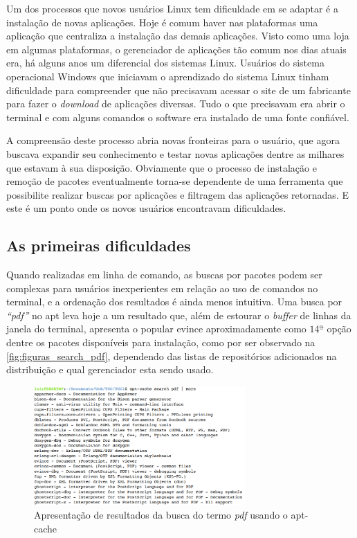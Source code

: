 
Um dos processos  que novos usuários Linux tem dificuldade em se adaptar é a instalação de novas aplicações. Hoje é comum haver nas plataformas uma aplicação que centraliza a instalação das demais aplicações. Visto como uma loja em algumas plataformas, o gerenciador de aplicações tão comum nos dias atuais era, há alguns anos um diferencial dos sistemas Linux. Usuários do sistema operacional Windows que iniciavam o aprendizado do sistema Linux  tinham dificuldade para compreender que não precisavam acessar o site de um fabricante para fazer o \textit{download} de aplicações diversas. Tudo o que precisavam era abrir o terminal e com alguns comandos o software era instalado de uma fonte confiável. 

A compreensão deste processo abria novas fronteiras para o  usuário, que agora buscava expandir seu conhecimento e testar novas aplicações dentre as milhares que estavam à sua disposição. Obviamente que o processo de instalação e remoção de pacotes eventualmente torna-se dependente de uma ferramenta que possibilite realizar buscas por aplicações e filtragem das aplicações retornadas. E este é um ponto onde os novos usuários encontravam dificuldades. 

\subsection*{As primeiras dificuldades} %
\label{sub:as_primeiras_dificuldades}


Quando realizadas em linha de comando, as buscas por pacotes podem ser complexas para usuários inexperientes em relação ao uso de comandos no terminal, e a ordenação dos resultados é ainda menos intuitiva. Uma busca por \textit{``pdf''} no {\code apt} leva hoje a um resultado que, além de estourar o \textit{buffer} de linhas da janela do terminal, apresenta o popular {\code evince} aproximadamente como $14ª$ opção dentre os  pacotes disponíveis para instalação, como por ser observado na \autoref{fig:figuras_search_pdf}, dependendo das listas de repositórios adicionados na distribuição e qual gerenciador esta sendo usado.

\begin{figure}[h]
  \centering
	\includegraphics[width=0.72\textwidth]{figuras/search_pdf}
  \caption{Apresentação de resultados da busca do termo \textit{pdf} usando o {\code apt-cache}}
  \label{fig:figuras_search_pdf}
\end{figure}

